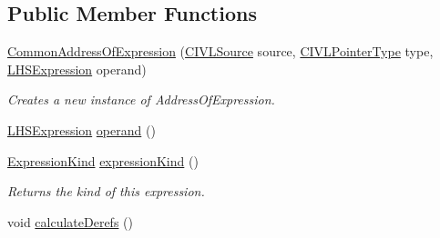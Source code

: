 \subsection*{Public Member Functions}
\begin{DoxyCompactItemize}
\item 
\hyperlink{classedu_1_1udel_1_1cis_1_1vsl_1_1civl_1_1model_1_1common_1_1expression_1_1CommonAddressOfExpression_a34bab09e11ce9f72ad59a32b206e3ef0}{Common\+Address\+Of\+Expression} (\hyperlink{interfaceedu_1_1udel_1_1cis_1_1vsl_1_1civl_1_1model_1_1IF_1_1CIVLSource}{C\+I\+V\+L\+Source} source, \hyperlink{interfaceedu_1_1udel_1_1cis_1_1vsl_1_1civl_1_1model_1_1IF_1_1type_1_1CIVLPointerType}{C\+I\+V\+L\+Pointer\+Type} type, \hyperlink{interfaceedu_1_1udel_1_1cis_1_1vsl_1_1civl_1_1model_1_1IF_1_1expression_1_1LHSExpression}{L\+H\+S\+Expression} operand)
\begin{DoxyCompactList}\small\item\em Creates a new instance of Address\+Of\+Expression. \end{DoxyCompactList}\item 
\hyperlink{interfaceedu_1_1udel_1_1cis_1_1vsl_1_1civl_1_1model_1_1IF_1_1expression_1_1LHSExpression}{L\+H\+S\+Expression} \hyperlink{classedu_1_1udel_1_1cis_1_1vsl_1_1civl_1_1model_1_1common_1_1expression_1_1CommonAddressOfExpression_a2ecb806cb83ebbae698ced5abe1df3f9}{operand} ()
\item 
\hyperlink{enumedu_1_1udel_1_1cis_1_1vsl_1_1civl_1_1model_1_1IF_1_1expression_1_1Expression_1_1ExpressionKind}{Expression\+Kind} \hyperlink{classedu_1_1udel_1_1cis_1_1vsl_1_1civl_1_1model_1_1common_1_1expression_1_1CommonAddressOfExpression_a7288fcbc58abb88e9f33c63d55d770fc}{expression\+Kind} ()
\begin{DoxyCompactList}\small\item\em Returns the kind of this expression. \end{DoxyCompactList}\item 
\hypertarget{classedu_1_1udel_1_1cis_1_1vsl_1_1civl_1_1model_1_1common_1_1expression_1_1CommonAddressOfExpression_abb5c8d7566c8e8672f8db25f8b71429b}{}void \hyperlink{classedu_1_1udel_1_1cis_1_1vsl_1_1civl_1_1model_1_1common_1_1expression_1_1CommonAddressOfExpression_abb5c8d7566c8e8672f8db25f8b71429b}{calculate\+Derefs} ()\label{classedu_1_1udel_1_1cis_1_1vsl_1_1civl_1_1model_1_1common_1_1expression_1_1CommonAddressOfExpression_abb5c8d7566c8e8672f8db25f8b71429b}


\end{DoxyCompactItemize}
